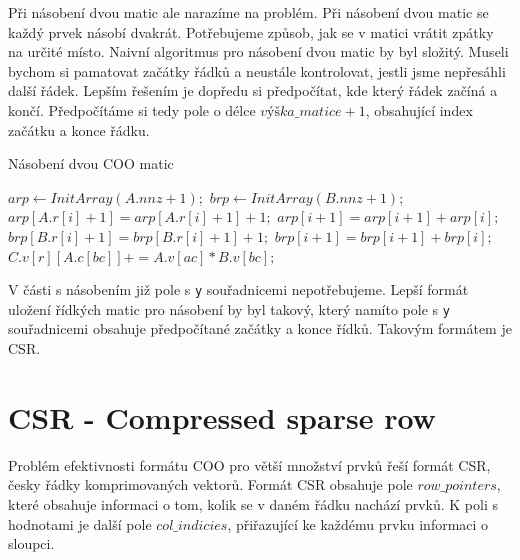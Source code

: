 Při násobení dvou matic ale narazíme na problém. Při násobení dvou matic se každý prvek násobí dvakrát. Potřebujeme způsob, jak se v matici vrátit zpátky na určité místo. Naivní algoritmus pro násobení dvou matic by byl složitý. Museli bychom si pamatovat začátky řádků a neustále kontrolovat, jestli jsme nepřesáhli další řádek. Lepším řešením je dopředu si předpočítat, kde který řádek začíná a končí. Předpočítáme si tedy pole o délce $výška\_ matice + 1$, obsahující index začátku a konce řádku.

\begin{algorithm}[H]
	\caption{Násobení dvou COO matic}\label{coo-mmm}
	\begin{algorithmic}[1]
		\State \texttt{$arp\gets InitArray(A.nnz + 1);$}
		\State \texttt{$brp\gets InitArray(B.nnz + 1);$}
			\State \texttt{$arp[A.r[i]+1] = arp[A.r[i]+1] + 1;$}
		\EndFor
			\State \texttt{$arp[i+1] = arp[i+1] + arp[i];$}
		\EndFor
			\State \texttt{$brp[B.r[i]+1] = brp[B.r[i]+1] + 1;$}
		\EndFor
			\State \texttt{$brp[i+1] = brp[i+1] + brp[i];$}
		\EndFor
					\State \texttt{$C.v[r][A.c[bc]] += A.v[ac] * B.v[bc];$}
				\EndFor
			\EndFor
		\EndFor
		\EndProcedure
	\end{algorithmic}
\end{algorithm}

V části s násobením již pole s \texttt{y} souřadnicemi nepotřebujeme. Lepší formát uložení řídkých matic pro násobení by byl takový, který namíto pole s \texttt{y} souřadnicemi obsahuje předpočítané začátky a konce řídků. Takovým formátem je CSR.

\section{CSR - Compressed sparse row}

Problém efektivnosti formátu COO pro větší množství prvků řeší formát CSR, česky řádky komprimovaných vektorů. Formát CSR obsahuje pole $row\_pointers$, které obsahuje informaci o tom, kolik se v daném řádku nachází prvků. K poli s hodnotami je další pole $col\_indicies$, přiřazující ke každému prvku informaci o sloupci.

